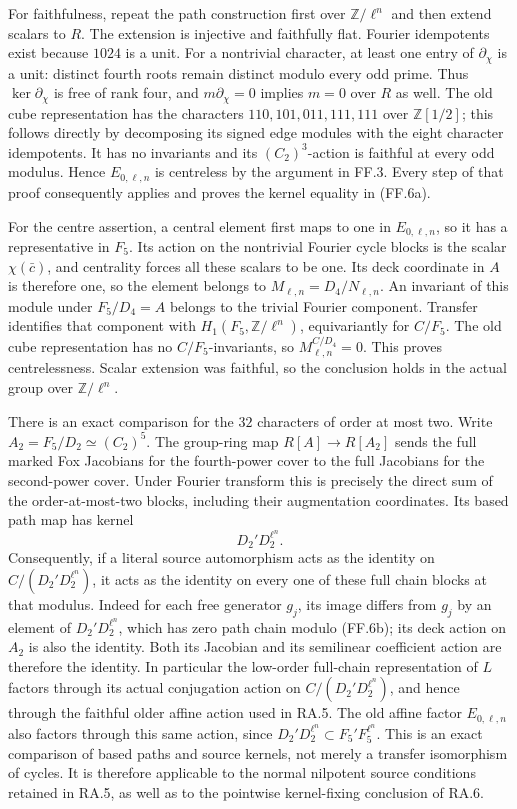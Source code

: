 For faithfulness, repeat the path construction first over
$\mathbb Z/\ell^n$ and then extend scalars to $R$. The
extension is injective and faithfully flat. Fourier
idempotents exist because $1024$ is a unit. For a nontrivial
character, at least one entry of $\partial_\chi$ is a unit:
distinct fourth roots remain distinct modulo every odd
prime. Thus $\ker\partial_\chi$ is free of rank four,
and $m\partial_\chi=0$ implies $m=0$ over $R$ as well.
The old cube representation has the characters
$110,101,011,111,111$ over $\mathbb Z[1/2]$; this follows
directly by decomposing its signed edge modules with the
eight character idempotents. It has no invariants and its
$(C_2)^3$-action is faithful at every odd modulus. Hence
$E_{0,\ell,n}$ is centreless by the argument in FF.3.
Every step of that proof consequently applies and proves
the kernel equality in (FF.6a).

For the centre assertion, a central element first maps to
one in $E_{0,\ell,n}$, so it has a representative in $F_5$.
Its action on the nontrivial Fourier cycle blocks is the
scalar $\chi(\bar c)$, and centrality forces all these
scalars to be one. Its deck coordinate in $A$ is therefore
one, so the element belongs to
$M_{\ell,n}=D_4/N_{\ell,n}$. An invariant of this module
under $F_5/D_4=A$ belongs to the trivial Fourier component.
Transfer identifies that component with
$H_1(F_5,\mathbb Z/\ell^n)$, equivariantly for $C/F_5$.
The old cube representation has no $C/F_5$-invariants,
so $M_{\ell,n}^{C/D_4}=0$. This proves centrelessness.
Scalar extension was faithful, so the conclusion holds in
the actual group over $\mathbb Z/\ell^n$.

There is an exact comparison for the $32$ characters of
order at most two. Write $A_2=F_5/D_2\simeq(C_2)^5$.
The group-ring map $R[A]\to R[A_2]$ sends the full
marked Fox Jacobians for the fourth-power cover to the
full Jacobians for the second-power cover. Under Fourier
transform this is precisely the direct sum of the
order-at-most-two blocks, including their augmentation
coordinates. Its based path map has kernel
\[
                         D_2'D_2^{\ell^n}.
 \tag{FF.6b}
\]
Consequently, if a literal source automorphism acts as the
identity on $C/(D_2'D_2^{\ell^n})$, it acts as the identity
on every one of these full chain blocks at that modulus.
Indeed for each free generator $g_j$, its image differs
from $g_j$ by an element of $D_2'D_2^{\ell^n}$,
which has zero path chain modulo (FF.6b); its deck action
on $A_2$ is also the identity. Both its Jacobian and its
semilinear coefficient action are therefore the identity.
In particular the low-order full-chain representation of
$L$ factors through its actual conjugation action on
$C/(D_2'D_2^{\ell^n})$, and hence through the faithful
older affine action used in RA.5. The old affine factor
$E_{0,\ell,n}$ also factors
through this same action, since
$D_2'D_2^{\ell^n}\subset F_5'F_5^{\ell^n}$.
This is an exact comparison of based paths and source
kernels, not merely a transfer isomorphism of cycles.
It is therefore applicable to the normal nilpotent source
conditions retained in RA.5, as well as to the pointwise
kernel-fixing conclusion of RA.6.

